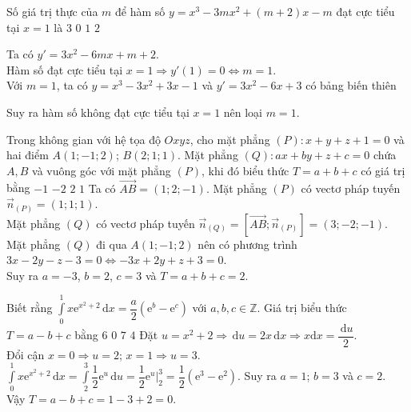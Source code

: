 \begin{ex}%
Số giá trị thực của $m$ để hàm số $y=x^3-3m x^2+(m+2) x-m$ đạt cực tiểu tại $x=1$ là
\choice
{$3$}
{\True $0$}
{$1$}
{$2$}
\loigiai
{
Ta có $y'=3x^2-6mx+m+2$.\\
Hàm số đạt cực tiểu tại $x=1\Rightarrow y'(1)=0\Leftrightarrow m=1$.\\
Với $m=1$, ta có $y=x^3-3x^2+3x-1$ và $y'=3x^2-6x+3$ có bảng biến thiên
\begin{center}
\end{center}
Suy ra hàm số không đạt cực tiểu tại $x=1$ nên loại $m=1$.
}
\end{ex}

\begin{ex}%
Trong không gian với hệ tọa độ $O x y z$, cho mặt phẳng $(P)\colon x+y+z+1=0$ và hai điểm $A(1;-1;2)$; $B(2;1;1)$. Mặt phẳng $(Q)\colon a x+b y+z+c=0$ chứa $A,B$ và vuông góc với mặt phẳng $(P)$, khi đó biểu thức $T=a+b+c$ có giá trị bằng
\choice
{$-1$}
{$-2$}
{\True $2$}
{$1$}
\loigiai
{
Ta có $\overrightarrow{AB}=(1;2;-1)$. Mặt phẳng $(P)$ có vectơ pháp tuyến $\overrightarrow{n}_{(P)}=(1;1;1)$.\\
Mặt phẳng $(Q)$ có vectơ pháp tuyến $\overrightarrow{n}_{(Q)}=\left[\overrightarrow{AB};\overrightarrow{n}_{(P)}\right]=(3;-2;-1)$.\\
Mặt phẳng $(Q)$ đi qua $A(1;-1;2)$ nên có phương trình $3x-2y-z-3=0\Leftrightarrow -3x+2y+z+3=0$.\\
Suy ra $a=-3$, $b=2$, $c=3$ và $T=a+b+c=2$.
}
\end{ex}
\begin{ex}%
Biết rằng $\displaystyle\int\limits_0^1x\mathrm{e}^{x^2+2}\mathrm{\, d}x=\dfrac{a}{2}\left(\mathrm{e}^b-\mathrm{e}^c\right)$ với $a,b,c\in\mathbb{Z}$. Giá trị biểu thức $T=a-b+c$ bằng
\choice
{$6$}
{\True $0$}
{$7$}
{$4$}
\loigiai
{
Đặt $u=x^2+2\Rightarrow \mathrm{\,d}u=2x\mathrm{\,d}x\Rightarrow x\mathrm{d}x=\dfrac{\mathrm{\,d}u}{2}$.\\
Đổi cận $x=0\Rightarrow u=2$; $x=1\Rightarrow u=3$.\\
$\displaystyle\int\limits_0^1x\mathrm{e}^{x^2+2}\mathrm{\, d}x=\displaystyle\int\limits_2^3 \dfrac{1}{2}\mathrm{e}^u\mathrm{\,d}u=\dfrac{1}{2}\mathrm{e}^u\bigg|_2^3=\dfrac{1}{2}(\mathrm{e}^3-\mathrm{e}^2)$. Suy ra $a=1$; $b=3$ và $c=2$.\\
Vậy $T=a-b+c=1-3+2=0$.
}
\end{ex}

